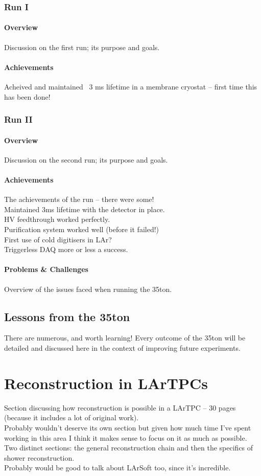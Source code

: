 \documentclass[a4paper,12pt]{report}
\begin{document}
\subsubsection{Run I}
\paragraph{Overview}
Discussion on the first run; its purpose and goals.
\paragraph{Achievements}
Acheived and maintained ~3 ms lifetime in a membrane cryostat -- first time this has been done!
\subsubsection{Run II}
\paragraph{Overview}
Discussion on the second run; its purpose and goals.
\paragraph{Achievements}
The achievements of the run -- there were some!\\
Maintained 3ms lifetime with the detector in place.\\
HV feedthrough worked perfectly.\\
Purification system worked well (before it failed!)\\
First use of cold digitisers in LAr?\\
Triggerless DAQ more or less a success.
\paragraph{Problems \& Challenges}
Overview of the issues faced when running the 35ton.
\subsection{Lessons from the 35ton}
There are numerous, and worth learning!  Every outcome of the 35ton will be detailed and discussed here in the context of improving future experiments.

\section{Reconstruction in LArTPCs}
Section discussing how reconstruction is possible in a LArTPC -- 30 pages (because it includes a lot of original work).\\
Probably wouldn't deserve its own section but given how much time I've spent working in this area I think it makes sense to focus on it as much as possible.\\
Two distinct sections: the general reconstruction chain and then the specifics of shower reconstruction.\\
Probably would be good to talk about LArSoft too, since it's incredible.
\end{document}
